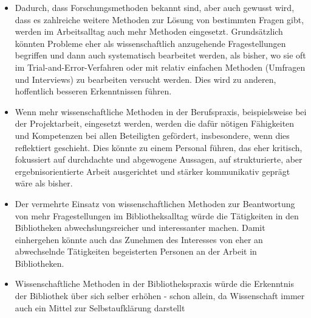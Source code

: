 \documentclass[a4paper,
fontsize=11pt,
oneside,
numbers=noperiodatend,
parskip=half-,
bibliography=totoc,
final
]{scrartcl}
\begin{document}
\begin{itemize}
\item
  Dadurch, dass Forschungsmethoden bekannt sind, aber auch gewusst wird,
  dass es zahlreiche weitere Methoden zur Lösung von bestimmten Fragen
  gibt, werden im Arbeitsalltag auch mehr Methoden eingesetzt.
  Grundsätzlich könnten Probleme eher als wissenschaftlich anzugehende
  Fragestellungen begriffen und dann auch systematisch bearbeitet
  werden, als bisher, wo sie oft im Trial-and-Error-Verfahren oder mit
  relativ einfachen Methoden (Umfragen und Interviews) zu bearbeiten
  versucht werden. Dies wird zu anderen, hoffentlich besseren
  Erkenntnissen führen.
\item
  Wenn mehr wissenschaftliche Methoden in der Berufspraxis,
  beispielsweise bei der Projektarbeit, eingesetzt werden, werden die
  dafür nötigen Fähigkeiten und Kompetenzen bei allen Beteiligten
  gefördert, insbesondere, wenn dies reflektiert geschieht. Dies könnte
  zu einem Personal führen, das eher kritisch, fokussiert auf
  durchdachte und abgewogene Aussagen, auf strukturierte, aber
  ergebnisorientierte Arbeit ausgerichtet und stärker kommunikativ
  geprägt wäre als bisher.
\item
  Der vermehrte Einsatz von wissenschaftlichen Methoden zur Beantwortung
  von mehr Fragestellungen im Bibliotheksalltag würde die Tätigkeiten in
  den Bibliotheken abwechslungsreicher und interessanter machen. Damit
  einhergehen könnte auch das Zunehmen des Interesses von eher an
  abwechselnde Tätigkeiten begeisterten Personen an der Arbeit in
  Bibliotheken.
\item
  Wissenschaftliche Methoden in der Bibliothekspraxis würde die
  Erkenntnis der Bibliothek über sich selber erhöhen - schon allein, da
  Wissenschaft immer auch ein Mittel zur Selbstaufklärung darstellt


\end{itemize}
\end{document}
